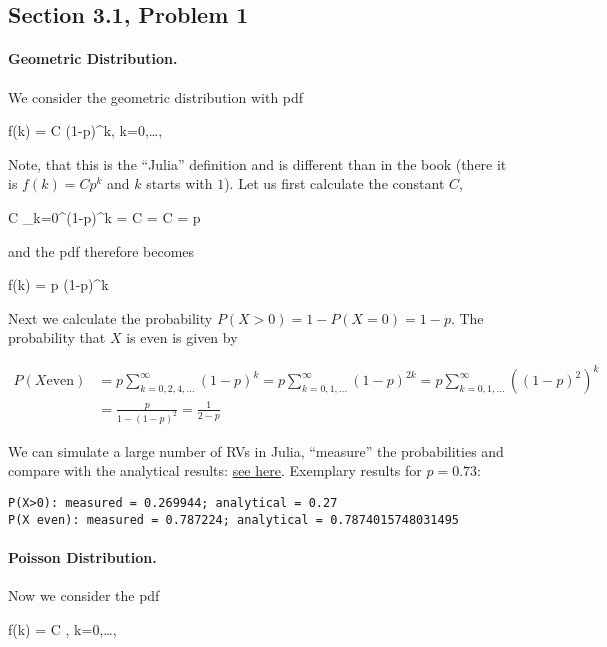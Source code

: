 
\subsection{Section 3.1, Problem 1}

\paragraph{Geometric Distribution.} We consider the geometric distribution with pdf

\bee
f(k) = C (1-p)^k, k=0,\ldots,\infty
\eee

Note, that this is the ``Julia'' definition and is different than in the book (there it is $f(k) = Cp^k$ and $k$ starts with $1$). Let us first calculate the constant $C$,

\bee
C \sum_{k=0}^\infty (1-p)^k = C  =   \rightarrow C = p
\eee

and the pdf therefore becomes

\bee
f(k) =  p (1-p)^k
\eee

Next we calculate the probability $P(X>0) = 1 - P(X=0) = 1-p$. The probability that $X$ is even is given by

\begin{align*}
P(X \text{even}) &= p \sum_{k=0,2,4,\ldots}^\infty (1-p)^k = p \sum_{k=0,1,\ldots}^\infty (1-p)^{2k} = p \sum_{k=0,1,\ldots}^\infty \left((1-p)^{2}\right)^k \\ &= \frac{p}{1-(1-p)^2} = \frac{1}{2-p}
\end{align*}

We can simulate a large number of RVs in Julia, ``measure'' the probabilities and compare with the analytical results: \href{https://github.com/ClemensFMN/JuliaStuff/blob/master/stochastic/geom_rv_2.jl}{see here}. Exemplary results for $p=0.73$:

\begin{verbatim}
P(X>0): measured = 0.269944; analytical = 0.27
P(X even): measured = 0.787224; analytical = 0.7874015748031495
\end{verbatim}


\paragraph{Poisson Distribution.} Now we consider the pdf

\bee
f(k) = C , k=0,\ldots,\infty
\eee

